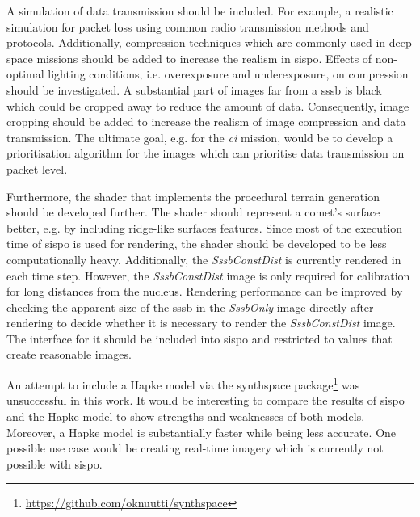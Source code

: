 A simulation of data transmission should be included. For example, a realistic simulation for packet loss using common radio transmission methods and protocols. Additionally, compression techniques which are commonly used in deep space missions should be added to increase the realism in \gls{sispo}. Effects of non-optimal lighting conditions, i.e. overexposure and underexposure, on compression should be investigated. A substantial part of images far from a \gls{sssb} is black which could be cropped away to reduce the amount of data. Consequently, image cropping should be added to increase the realism of image compression and data transmission. The ultimate goal, e.g. for the \textit{\gls{ci}} mission, would be to develop a prioritisation algorithm for the images which can prioritise data transmission on packet level.

Furthermore, the shader that implements the procedural terrain generation should be developed further. The shader should represent a comet's surface better, e.g. by including ridge-like surfaces features. Since most of the execution time of \gls{sispo} is used for rendering, the shader should be developed to be less computationally heavy. Additionally, the \textit{SssbConstDist} is currently rendered in each time step. However, the \textit{SssbConstDist} image is only required for calibration for long distances from the nucleus. Rendering performance can be improved by checking the apparent size of the \gls{sssb} in the \textit{SssbOnly} image directly after rendering to decide whether it is necessary to render the \textit{SssbConstDist} image.  The interface for it should be included into \gls{sispo} and restricted to values that create reasonable images.

An attempt to include a Hapke model via the synthspace package\footnote{\url{https://github.com/oknuutti/synthspace}} was unsuccessful in this work. It would be interesting to compare the results of \gls{sispo} and the Hapke model to show strengths and weaknesses of both models. Moreover, a Hapke model is substantially faster while being less accurate. One possible use case would be creating real-time imagery which is currently not possible with \gls{sispo}.